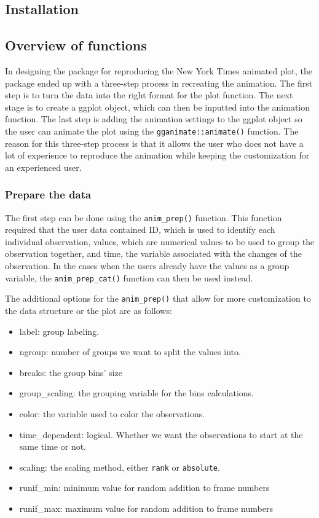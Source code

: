 \hypertarget{installation}{%
\subsection{Installation}\label{installation}}

\hypertarget{overview-of-functions}{%
\subsection{Overview of functions}\label{overview-of-functions}}

In designing the package for reproducing the New York Times animated plot, the package ended up with a three-step process in recreating the animation. The first step is to turn the data into the right format for the plot function. The next stage is to create a ggplot object, which can then be inputted into the animation function. The last step is adding the animation settings to the ggplot object so the user can animate the plot using the \texttt{gganimate::animate()} function. The reason for this three-step process is that it allows the user who does not have a lot of experience to reproduce the animation while keeping the customization for an experienced user.

\hypertarget{prepare-the-data}{%
\subsubsection{Prepare the data}\label{prepare-the-data}}

The first step can be done using the \texttt{anim\_prep()} function. This function required that the user data contained ID, which is used to identify each individual observation, values, which are numerical values to be used to group the observation together, and time, the variable associated with the changes of the observation. In the cases when the users already have the values as a group variable, the \texttt{anim\_prep\_cat()} function can then be used instead.

The additional options for the \texttt{anim\_prep()} that allow for more customization to the data structure or the plot are as follows:

\begin{itemize}
\tightlist
\item
  label: group labeling.
\item
  ngroup: number of groups we want to split the values into.
\item
  breaks: the group bins' size
\item
  group\_scaling: the grouping variable for the bins calculations.
\item
  color: the variable used to color the observations.
\item
  time\_dependent: logical. Whether we want the observations to start at the same time or not.
\item
  scaling: the scaling method, either \texttt{rank} or \texttt{absolute}.
\item
  runif\_min: minimum value for random addition to frame numbers
\item
  runif\_max: maximum value for random addition to frame numbers
\end{itemize}

